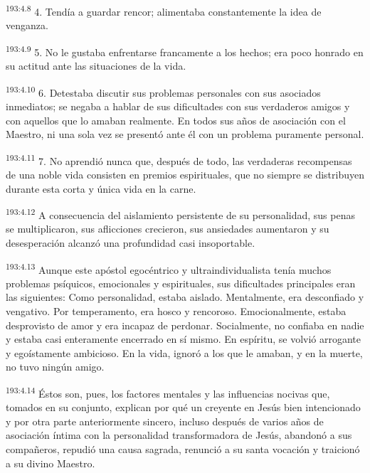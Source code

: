 \par 
\textsuperscript{193:4.8} 4. Tendía a guardar rencor; alimentaba constantemente la idea de venganza.

\par 
\textsuperscript{193:4.9} 5. No le gustaba enfrentarse francamente a los hechos; era poco honrado en su actitud ante las situaciones de la vida.

\par 
\textsuperscript{193:4.10} 6. Detestaba discutir sus problemas personales con sus asociados inmediatos; se negaba a hablar de sus dificultades con sus verdaderos amigos y con aquellos que lo amaban realmente. En todos sus años de asociación con el Maestro, ni una sola vez se presentó ante él con un problema puramente personal.

\par 
\textsuperscript{193:4.11} 7. No aprendió nunca que, después de todo, las verdaderas recompensas de una noble vida consisten en premios espirituales, que no siempre se distribuyen durante esta corta y única vida en la carne.

\par 
\textsuperscript{193:4.12} A consecuencia del aislamiento persistente de su personalidad, sus penas se multiplicaron, sus aflicciones crecieron, sus ansiedades aumentaron y su desesperación alcanzó una profundidad casi insoportable.

\par 
\textsuperscript{193:4.13} Aunque este apóstol egocéntrico y ultraindividualista tenía muchos problemas psíquicos, emocionales y espirituales, sus dificultades principales eran las siguientes: Como personalidad, estaba aislado. Mentalmente, era desconfiado y vengativo. Por temperamento, era hosco y rencoroso. Emocionalmente, estaba desprovisto de amor y era incapaz de perdonar. Socialmente, no confiaba en nadie y estaba casi enteramente encerrado en sí mismo. En espíritu, se volvió arrogante y egoístamente ambicioso. En la vida, ignoró a los que le amaban, y en la muerte, no tuvo ningún amigo.

\par 
\textsuperscript{193:4.14} Éstos son, pues, los factores mentales y las influencias nocivas que, tomados en su conjunto, explican por qué un creyente en Jesús bien intencionado y por otra parte anteriormente sincero, incluso después de varios años de asociación íntima con la personalidad transformadora de Jesús, abandonó a sus compañeros, repudió una causa sagrada, renunció a su santa vocación y traicionó a su divino Maestro.

